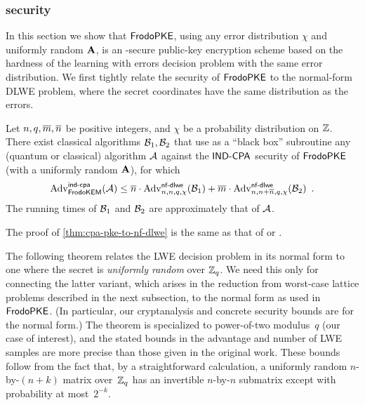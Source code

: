 \documentclass{iacrcc}
\begin{document}
\subsubsection{\INDCPA security}\label{sec:strength:cpa-pke}

In this section we show that $\textsf{\upshape\mdseries FrodoPKE}$, using any error distribution
$\chi$ and uniformly random $\mathbf{A}$, is an \INDCPA-secure public-key
encryption scheme based on the hardness of the learning with errors
decision problem with the same error distribution. We first tightly
relate the \INDCPA security of $\textsf{\upshape\mdseries FrodoPKE}$ to the normal-form DLWE
problem, where the secret coordinates have the same distribution as
the errors.

\begin{theorem}
  \label{thm:cpa-pke-to-nf-dlwe}
  Let $n, q, \overline{m}, \overline{n}$ be positive integers, and $\chi$ be a
  probability distribution on $\mathbb{Z}$. There exist classical algorithms
  $\mathcal{B}_{1}, \mathcal{B}_{2}$ that use as a ``black box''
  subroutine any (quantum or classical) algorithm $\mathcal{A}$ against
  the $\textsf{\upshape\mdseries IND-CPA}$ security of $\textsf{\upshape\mdseries FrodoPKE}$ (with a uniformly random
  $\mathbf{A}$), for which
  \[ \mathrm{Adv}^{\textsf{\upshape\mdseries \textsf{\upshape\mdseries ind-cpa}}}_{\textsf{\upshape\mdseries FrodoKEM}}(\mathcal{A}) \leq \overline{n} \cdot
    \mathrm{Adv}^{\textsf{\upshape\mdseries \textsf{\upshape\mdseries nf-dlwe}}}_{n,n,q,\chi}(\mathcal{B}_1) + \overline{m} \cdot
    \mathrm{Adv}^{\textsf{\upshape\mdseries \textsf{\upshape\mdseries nf-dlwe}}}_{n,n+\overline{n},q,\chi}(\mathcal{B}_2) \enspace . \] The
  running times of $\mathcal{B}_1$ and $\mathcal{B}_2$ are approximately
  that of $\mathcal{A}$.
\end{theorem}
The proof of \autoref{thm:cpa-pke-to-nf-dlwe} is the same as that of
\cite[Theorem~3.2]{RSA:LinPei11} or \cite[Theorem~5.1]{CCS:BCDMNN16}.

The following theorem relates the LWE decision problem in its normal
form to one where the secret is \emph{uniformly random} over
$\mathbb{Z}_{q}$. We need this only for connecting the latter variant, which
arises in the reduction from worst-case lattice problems described in
the next subsection, to the normal form as used in $\textsf{\upshape\mdseries FrodoPKE}$. (In
particular, our cryptanalysis and concrete security bounds are for the
normal form.) The theorem is specialized to power-of-two modulus~$q$
(our case of interest), and the stated bounds in the advantage and
number of LWE samples are more precise than those given in the
original work. These bounds follow from the fact that, by a
straightforward calculation, a uniformly random $n$-by-$(n+k)$ matrix
over~$\mathbb{Z}_{q}$ has an invertible $n$-by-$n$ submatrix except with
probability at most~$2^{-k}$.
\end{document}
